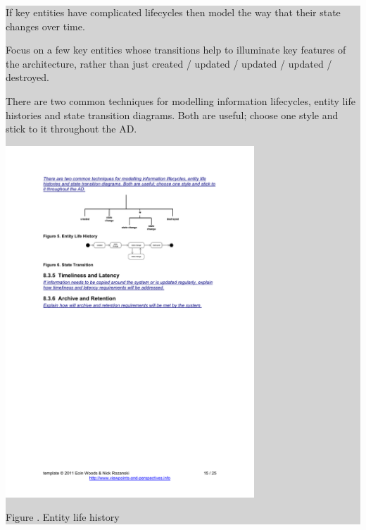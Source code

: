 \documentclass[a4paper,11pt]{report}
\newcommand{\instructions}[1]{
  \noindent\colorbox{lightgray}{%
    \parbox{\linewidth}{%
      #1
    }%
  }%
 \vspace{0.1cm}
}
\newcommand{\mycaption}[1]{
  \addtocounter{figures}{1}
  Figure \arabic{figures}. #1
}
\begin{document}
\instructions{
If key entities have complicated lifecycles then model the way that
their state changes over time.

Focus on a few key entities whose transitions help to illuminate key
features of the architecture, rather than just
created / updated / updated / updated / destroyed.

There are two common techniques for modelling information lifecycles,
entity life histories and state transition diagrams. Both are useful;
choose one style and stick to it throughout the AD.

\begin{center}
  \includegraphics[width=0.7\textwidth]{figures/entitylifehistory}\\
  \mycaption{Entity life history}
\end{center}

}
\end{document}

